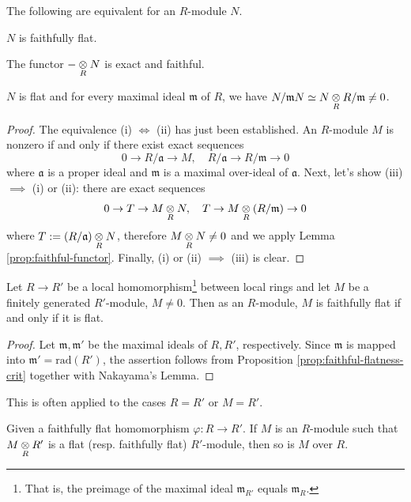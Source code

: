 \begin{proposition}\label{prop:faithful-flatness-crit}
	The following are equivalent for an $R$-module $N$.
	\begin{compactenum}[(i)]
		\item $N$ is faithfully flat.
		\item The functor $- \underset{R}{\otimes} N$ is exact and faithful.
		\item $N$ is flat and for every maximal ideal $\mathfrak{m}$ of $R$, we have $N/\mathfrak{m}N \simeq N \underset{R}{\otimes} R/\mathfrak{m} \neq 0$.
	\end{compactenum}
\end{proposition}
\begin{proof}
	The equivalence (i) $\iff$ (ii) has just been established. An $R$-module $M$ is nonzero if and only if there exist exact sequences
	\[ 0 \to R/\mathfrak{a} \to M, \quad R/\mathfrak{a} \to R/\mathfrak{m} \to 0 \]
	where $\mathfrak{a}$ is a proper ideal and $\mathfrak{m}$ is a maximal over-ideal of $\mathfrak{a}$. Next, let's show (iii) $\implies$ (i) or (ii): there are exact sequences
	\[ 0 \to T \to M \underset{R}{\otimes} N, \quad T \to M \underset{R}{\otimes} (R/\mathfrak{m}) \to 0 \]
	where $T := (R/\mathfrak{a}) \underset{R}{\otimes} N$, therefore $M \underset{R}{\otimes} N \neq 0$ and we apply Lemma \ref{prop:faithful-functor}. Finally, (i) or (ii) $\implies$ (iii) is clear.
\end{proof}

\begin{corollary}\label{prop:local-faithfully-flat}
	Let $R \to R'$ be a local homomorphism\footnote{That is, the preimage of the maximal ideal $\mathfrak{m}_{R'}$ equals $\mathfrak{m}_R$.} between local rings and let $M$ be a finitely generated $R'$-module, $M \neq 0$. Then as an $R$-module, $M$ is faithfully flat if and only if it is flat.
\end{corollary}
\begin{proof}
	Let $\mathfrak{m}, \mathfrak{m}'$ be the maximal ideals of $R, R'$, respectively. Since $\mathfrak{m}$ is mapped into $\mathfrak{m}' = \text{rad}(R')$, the assertion follows from Proposition \ref{prop:faithful-flatness-crit} together with Nakayama's Lemma.
\end{proof}

This is often applied to the cases $R=R'$ or $M=R'$.

\begin{exercise}
	Given a faithfully flat homomorphism $\varphi: R \to R'$. If $M$ is an $R$-module such that $M \underset{R}{\otimes} R'$ is a flat (resp. faithfully flat) $R'$-module, then so is $M$ over $R$.
\end{exercise}

